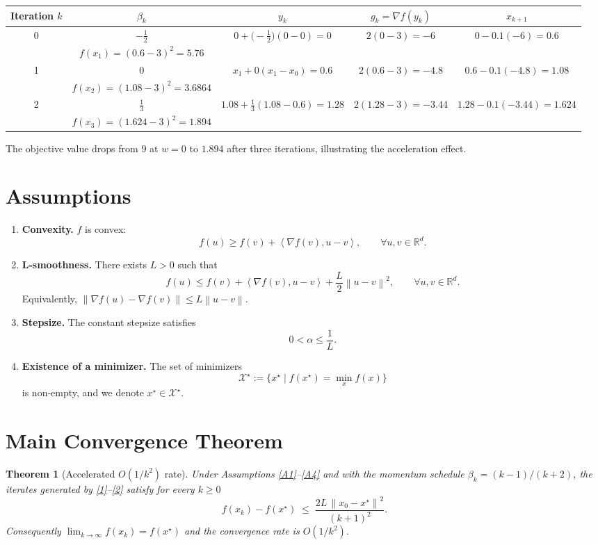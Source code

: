 \documentclass{article}
\newtheorem{theorem}{Theorem}
\newcommand{\grad}{\nabla}
\newcommand{\norm}[1]{\left\lVert#1\right\rVert}
\newcommand{\inner}[2]{\left\langle #1,#2\right\rangle}
\begin{document}
\begin{center}
\begin{tabular}{c|c|c|c|c}
\toprule
Iteration $k$ & $\beta_k$ & $y_k$ & $g_k=\grad f(y_k)$ & $x_{k+1}$ \\ \midrule
0 & $-\frac12$ & $0+\bigl(-\frac12\bigr)(0-0)=0$ & $2(0-3)=-6$ & $0-0.1(-6)=0.6$ \\
  & $f(x_1)= (0.6-3)^2=5.76$ & & & \\ \midrule
1 & $0$ & $x_1+0(x_1-x_0)=0.6$ & $2(0.6-3)=-4.8$ & $0.6-0.1(-4.8)=1.08$ \\
  & $f(x_2)=(1.08-3)^2=3.6864$ & & & \\ \midrule
2 & $\frac13$ & $1.08+\frac13(1.08-0.6)=1.28$ & $2(1.28-3)=-3.44$ & $1.28-0.1(-3.44)=1.624$ \\
  & $f(x_3)=(1.624-3)^2=1.894$ & & & \\ 
\bottomrule
\end{tabular}
\end{center}
The objective value drops from $9$ at $w=0$ to $1.894$ after three iterations, illustrating the acceleration effect.

\newpage
\section*{Assumptions}
\begin{enumerate}[label={\bf A\arabic*:},leftmargin=*]
\item \label{A1} \textbf{Convexity.} $f$ is convex:
\[
f(u)\ge f(v)+\inner{\grad f(v)}{u-v},\qquad\forall u,v\in\mathbb{R}^d .
\]
\item \label{A2} \textbf{L‑smoothness.} There exists $L>0$ such that
\[
f(u)\le f(v)+\inner{\grad f(v)}{u-v}+\frac{L}{2}\norm{u-v}^2,
\qquad\forall u,v\in\mathbb{R}^d .
\]
Equivalently, $\norm{\grad f(u)-\grad f(v)}\le L\norm{u-v}$.
\item \label{A3} \textbf{Stepsize.} The constant stepsize satisfies
\[
0<\alpha\le\frac{1}{L}.
\]
\item \label{A4} \textbf{Existence of a minimizer.} The set of minimizers 
\[
\mathcal{X}^\star:=\{x^\star\mid f(x^\star)=\min_{x}f(x)\}
\]
is non‑empty, and we denote $x^\star\in\mathcal{X}^\star$.
\end{enumerate}

\section*{Main Convergence Theorem}
\begin{theorem}[Accelerated $O(1/k^{2})$ rate]\label{thm:main}
Under Assumptions \ref{A1}–\ref{A4} and with the momentum schedule $\beta_k=(k-1)/(k+2)$,
the iterates generated by \eqref{1}–\eqref{2} satisfy for every $k\ge 0$
\[
f(x_k)-f(x^\star)\;\le\;
\frac{2L\,\norm{x_0-x^\star}^{2}}{(k+1)^2}.
\tag{3}
\]
Consequently $\displaystyle\lim_{k\to\infty}f(x_k)=f(x^\star)$ and the convergence
rate is $O(1/k^{2})$.
\end{theorem}
\end{document}
